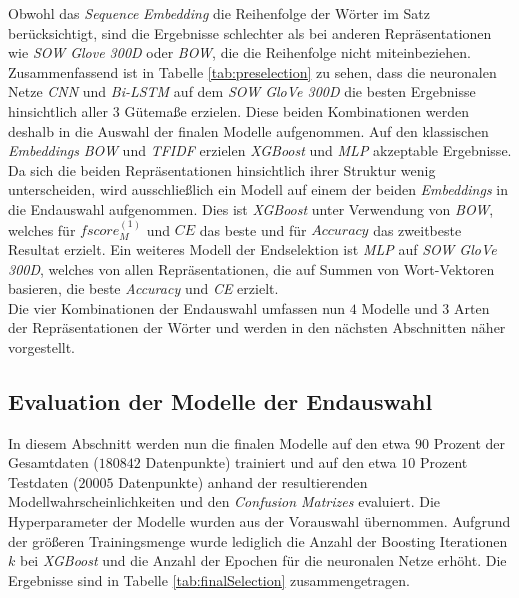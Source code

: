 \documentclass[a4paper,11pt]{article}
\begin{document}
Obwohl das \textit{Sequence} \textit{Embedding} die Reihenfolge der Wörter im Satz berücksichtigt, sind die Ergebnisse schlechter als bei anderen Repräsentationen wie \textit{SOW Glove 300D} oder \textit{BOW}, die die Reihenfolge nicht miteinbeziehen.\\

Zusammenfassend ist in Tabelle \ref{tab:preselection} zu sehen, dass die neuronalen Netze \textit{CNN} und \textit{Bi-LSTM} auf dem \textit{SOW GloVe 300D} die besten Ergebnisse hinsichtlich aller $3$ Gütemaße erzielen. Diese beiden Kombinationen werden deshalb in die Auswahl der finalen Modelle aufgenommen. Auf den klassischen \textit{Embeddings} \textit{BOW} und \textit{TFIDF} erzielen \textit{XGBoost} und \textit{MLP} akzeptable Ergebnisse. Da sich die beiden Repräsentationen hinsichtlich ihrer Struktur wenig unterscheiden, wird ausschließlich ein Modell auf einem der beiden \textit{Embeddings} in die Endauswahl aufgenommen. Dies ist \textit{XGBoost} unter Verwendung von \textit{BOW}, welches für $fscore_M^{(1)}$ und $CE$ das beste und für $Accuracy$ das zweitbeste Resultat erzielt. Ein weiteres Modell der Endselektion ist \textit{MLP} auf \textit{SOW GloVe 300D}, welches von allen Repräsentationen, die auf Summen von Wort-Vektoren basieren, die beste \textit{Accuracy} und \textit{CE} erzielt. \\

Die vier Kombinationen der Endauswahl umfassen nun $4$ Modelle und $3$ Arten der Repräsentationen der Wörter und werden in den nächsten Abschnitten näher vorgestellt.





\subsection{Evaluation der Modelle der Endauswahl} \label{kap:evalFinal}

In diesem Abschnitt werden nun die finalen Modelle auf den etwa $90$ Prozent der Gesamtdaten ($180842$ Datenpunkte) trainiert und auf den etwa $10$ Prozent Testdaten ($20005$ Datenpunkte) anhand der resultierenden Modellwahrscheinlichkeiten und den \textit{Confusion Matrizes} evaluiert. Die Hyperparameter der Modelle wurden aus der Vorauswahl übernommen. Aufgrund der größeren Trainingsmenge wurde lediglich die Anzahl der Boosting Iterationen $k$ bei \textit{XGBoost} und die Anzahl der Epochen für die neuronalen Netze erhöht. Die Ergebnisse sind in Tabelle \ref{tab:finalSelection} zusammengetragen. 
\end{document}
